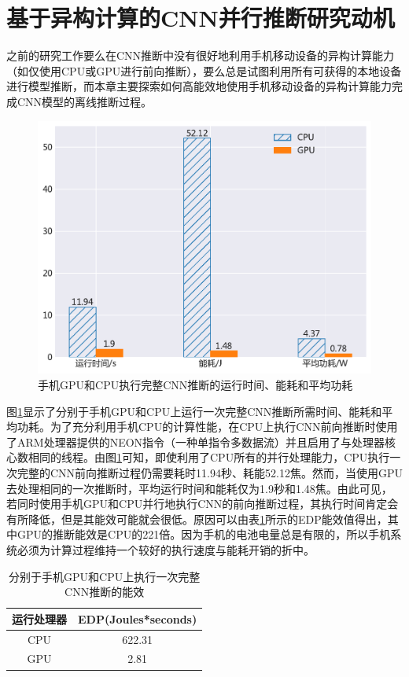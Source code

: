 \section{基于异构计算的CNN并行推断研究动机}
\label{chapter:chapter4-2}
之前的研究工作要么在CNN推断中没有很好地利用手机移动设备的异构计算能力（如仅使用CPU或GPU进行前向推断），要么总是试图利用所有可获得的本地设备进行模型推断，而本章主要探索如何高能效地使用手机移动设备的异构计算能力完成CNN模型的离线推断过程。

\begin{figure}[htbp]
    \centering
    \includegraphics[height=0.4\textwidth]{figures/yolo_energy.pdf}
    \caption{手机GPU和CPU执行完整CNN推断的运行时间、能耗和平均功耗}\label{figure:figure28}
\end{figure}

图\ref{figure:figure28}显示了分别于手机GPU和CPU上运行一次完整CNN推断所需时间、能耗和平均功耗。为了充分利用手机CPU的计算性能，在CPU上执行CNN前向推断时使用了ARM处理器提供的NEON指令（一种单指令多数据流）并且启用了与处理器核心数相同的线程。由图\ref{figure:figure28}可知，即使利用了CPU所有的并行处理能力，CPU执行一次完整的CNN前向推断过程仍需要耗时11.94秒、耗能52.12焦。然而，当使用GPU去处理相同的一次推断时，平均运行时间和能耗仅为1.9秒和1.48焦。由此可见，若同时使用手机GPU和CPU并行地执行CNN的前向推断过程，其执行时间肯定会有所降低，但是其能效可能就会很低。原因可以由表\ref{table:table9}所示的EDP能效值得出，其中GPU的推断能效是CPU的221倍。因为手机的电池电量总是有限的，所以手机系统必须为计算过程维持一个较好的执行速度与能耗开销的折中。

\begin{table}[htbp]
  \centering
  \caption{分别于手机GPU和CPU上执行一次完整CNN推断的能效}
  \label{table:table9}
  \begin{tabular}{cc}
    \toprule
      运行处理器 & EDP(Joules*seconds) \\
    \midrule
      CPU & 622.31 \\
      GPU & 2.81 \\
    \bottomrule
  \end{tabular}
\end{table}

